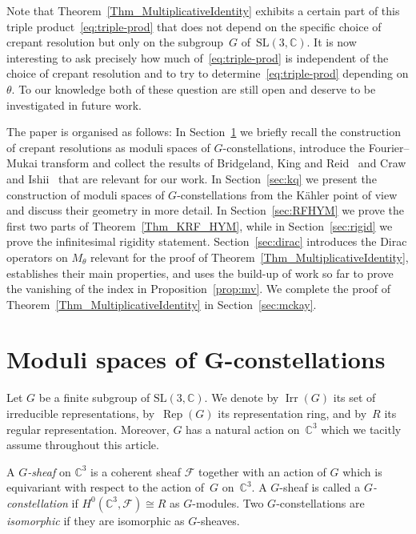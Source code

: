 \documentclass[pdftex]{sigma}
\numberwithin{equation}{section}
\newcommand{\sF}{\mathscr{F}}
\newcommand{\C}{{\mathbb C}}
\newcommand{\SL}{\mathrm{SL}}
\newcommand{\Irr}{\operatorname{Irr}}
\newcommand{\iso}{\cong}
\newcommand{\Rep}{\operatorname{Rep}}
\begin{document}
Note that Theorem~\ref{Thm_MultiplicativeIdentity} exhibits a certain part of this triple product~\eqref{eq:triple-prod} that does not depend on the specif\/ic choice of crepant resolution but only on the subgroup~$G$ of~$\SL(3,\C)$.
It is now interesting to ask precisely how much of~\eqref{eq:triple-prod} is independent of the choice of crepant resolution and to try to determine~\eqref{eq:triple-prod} depending on $\theta$.
To our knowledge both of these question are still open and deserve to be investigated in future work.

The paper is organised as follows:
In Section~\ref{Sec_ModuliSpacesOfGConstellations} we brief\/ly recall the construction of crepant resolutions as moduli spaces of $G$-constellations, introduce the Fourier--Mukai transform and collect the results of Bridgeland, King and Reid~\cite{Bridgeland2001} and Craw and Ishii~\cite{Craw2004} that are
relevant for our work.
In Section~\ref{sec:kq} we present the construction of moduli spaces of $G$-constellations from the K\"ahler point of view and discuss their geometry in more detail.
In Section~\ref{sec:RFHYM} we prove the f\/irst two parts of Theorem~\ref{Thm_KRF_HYM}, while in Section~\ref{sec:rigid} we prove the inf\/initesimal rigidity statement.
Section~\ref{sec:dirac} introduces the Dirac operators on $M_\theta$ relevant for the proof of Theorem~\ref{Thm_MultiplicativeIdentity}, establishes their main properties, and uses the build-up of work so far to prove the vanishing of the index in Proposition~\ref{prop:mv}.
We complete the proof of Theorem~\ref{Thm_MultiplicativeIdentity} in Section~\ref{sec:mckay}.

\section[Moduli spaces of $G$-constellations]{Moduli spaces of $\boldsymbol{G}$-constellations}
\label{Sec_ModuliSpacesOfGConstellations}

Let $G$ be a f\/inite subgroup of $\SL(3,\C)$.  We denote by $\Irr(G)$
its set of irreducible representations, by~$\Rep(G)$ its
representation ring, and by~$R$ its regular representation.  Moreover,
$G$ has a natural action on~$\C^3$ which we tacitly assume
throughout this article.

\begin{Definition}
  \label{Def_GConstellation}
  A \emph{$G$-sheaf} on $\C^3$ is a coherent sheaf $\sF$ together
  with an action of $G$ which is equivariant with respect to the
  action of~$G$ on~$\C^3$.  A $G$-sheaf is called a
  \emph{$G$-constellation} if $H^{0}(\C^3, \sF) \iso R$ as
  $G$-modules.  Two $G$-constellations are \emph{isomorphic} if they
  are isomorphic as $G$-sheaves.
\end{Definition}
\end{document}
